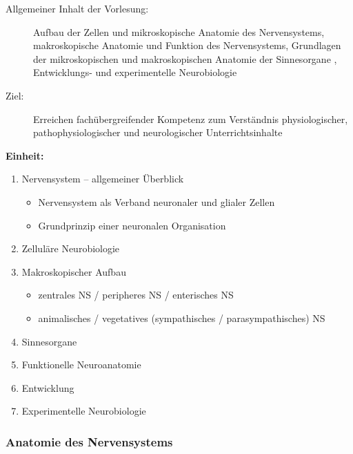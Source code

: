 \documentclass[%
a4paper, %
11pt,               %
leqno,              %
fleqn,              %
]
{scrartcl}
\begin{document}
\begin{description}
  \item[Allgemeiner Inhalt der Vorlesung:] Aufbau der Zellen und mikroskopische
    Anatomie des Nervensystems, makroskopische Anatomie und Funktion des
    Nervensystems, Grundlagen der mikroskopischen und makroskopischen Anatomie
    der Sinnesorgane , Entwicklungs- und experimentelle Neurobiologie
  \item[Ziel:] Erreichen fachübergreifender Kompetenz zum Verständnis
    physiologischer, pathophysiologischer und neurologischer Unterrichtsinhalte
\end{description}
\textsf{\textbf{Einheit:}}
\begin{enumerate}\itemsep0pt
  \item Nervensystem -- allgemeiner Überblick
  \begin{itemize}\itemsep0pt
    \item Nervensystem als Verband neuronaler und glialer Zellen
    \item Grundprinzip einer neuronalen Organisation
  \end{itemize}
  \item Zelluläre Neurobiologie
  \item Makroskopischer Aufbau
  \begin{itemize}\itemsep0pt
    \item zentrales NS / peripheres NS / enterisches NS
    \item animalisches / vegetatives (sympathisches / parasympathisches) NS
  \end{itemize}
  \item Sinnesorgane
  \item Funktionelle Neuroanatomie
  \item Entwicklung
  \item Experimentelle Neurobiologie
\end{enumerate}


\subsubsection{Anatomie des Nervensystems} %
\label{ssub:Anatomie des Nervensystems}
\end{document}
